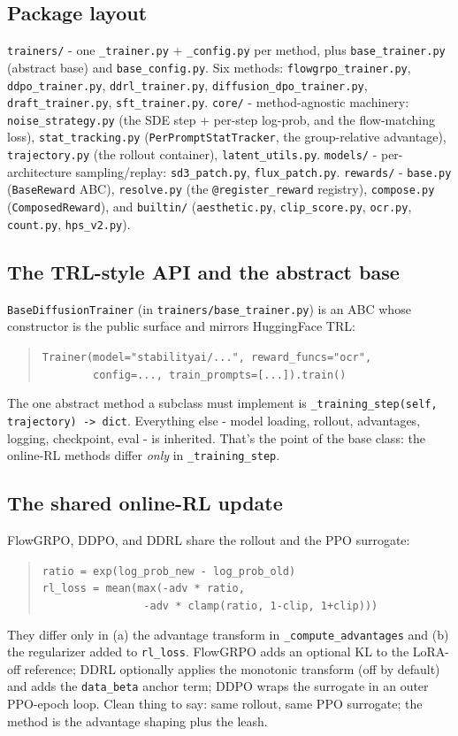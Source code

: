 \documentclass[11pt]{article}
\newcommand{\code}[1]{\texttt{\small #1}}
\begin{document}
\subsection{Package layout}
\code{trainers/} - one \code{*\_trainer.py} + \code{*\_config.py} per method, plus
\code{base\_trainer.py} (abstract base) and \code{base\_config.py}. Six methods:
\code{flowgrpo\_trainer.py}, \code{ddpo\_trainer.py}, \code{ddrl\_trainer.py},
\code{diffusion\_dpo\_trainer.py}, \code{draft\_trainer.py}, \code{sft\_trainer.py}.
\code{core/} - method-agnostic machinery: \code{noise\_strategy.py} (the SDE step +
per-step log-prob, and the flow-matching loss), \code{stat\_tracking.py}
(\code{PerPromptStatTracker}, the group-relative advantage), \code{trajectory.py} (the
rollout container), \code{latent\_utils.py}. \code{models/} - per-architecture
sampling/replay: \code{sd3\_patch.py}, \code{flux\_patch.py}. \code{rewards/} -
\code{base.py} (\code{BaseReward} ABC), \code{resolve.py} (the \code{@register\_reward}
registry), \code{compose.py} (\code{ComposedReward}), and \code{builtin/}
(\code{aesthetic.py}, \code{clip\_score.py}, \code{ocr.py}, \code{count.py},
\code{hps\_v2.py}).

\subsection{The TRL-style API and the abstract base}
\code{BaseDiffusionTrainer} (in \code{trainers/base\_trainer.py}) is an ABC whose
constructor is the public surface and mirrors HuggingFace TRL:
\begin{quote}\code{Trainer(model="stabilityai/...", reward\_funcs="ocr",}\\
\code{~~~~~~~~config=..., train\_prompts=[...]).train()}\end{quote}
The one abstract method a subclass must implement is
\code{\_training\_step(self, trajectory) -> dict}. Everything else - model loading,
rollout, advantages, logging, checkpoint, eval - is inherited. That's the point of the
base class: the online-RL methods differ \textit{only} in \code{\_training\_step}.

\subsection{The shared online-RL update}
FlowGRPO, DDPO, and DDRL share the rollout and the PPO surrogate:
\begin{quote}
\code{ratio = exp(log\_prob\_new - log\_prob\_old)}\\
\code{rl\_loss = mean(max(-adv * ratio,}\\
\code{~~~~~~~~~~~~~~~~-adv * clamp(ratio, 1-clip, 1+clip)))}
\end{quote}
They differ only in (a) the advantage transform in \code{\_compute\_advantages} and
(b) the regularizer added to \code{rl\_loss}. FlowGRPO adds an optional KL to the
LoRA-off reference; DDRL optionally applies the monotonic transform (off by default)
and adds the \code{data\_beta} anchor term; DDPO wraps the surrogate in an outer
PPO-epoch loop. Clean thing to say: same rollout, same PPO surrogate; the method is
the advantage shaping plus the leash.
\end{document}
